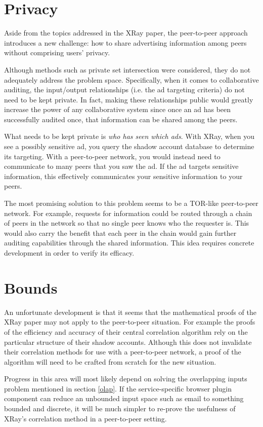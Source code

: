 \documentclass[12pt]{article}
\begin{document}
\section{Privacy}

Aside from the topics addressed in the XRay paper, the peer-to-peer approach
introduces a new challenge: how to share advertising information among peers
without comprising users' privacy.

Although methods such as private set intersection were considered, they do not
adequately address the problem space. Specifically, when it comes to
collaborative auditing, the input/output relationships (i.e. the ad targeting
criteria) do not need to be kept private. In fact, making these relationships
public would greatly increase the power of any collaborative system since once
an ad has been successfully audited once, that information can be shared among
the peers.

What needs to be kept private is {\it who has seen which ads}. With XRay, when
you see a possibly sensitive ad, you query the shadow account database to
determine its targeting. With a peer-to-peer network, you would instead need to
communicate to many peers that you saw the ad. If the ad targets sensitive
information, this effectively communicates your sensitive information to your
peers.

The most promising solution to this problem seems to be a TOR-like peer-to-peer
network. For example, requests for information could be routed through a chain
of peers in the network so that no single peer knows who the requester is. This
would also carry the benefit that each peer in the chain would gain further
auditing capabilities through the shared information. This idea requires
concrete development in order to verify its efficacy.

\section{Bounds}

An unfortunate development is that it seems that the mathematical proofs of the
XRay paper may not apply to the peer-to-peer situation. For example the proofs
of the efficiency and accuracy of their central correlation algorithm rely on
the particular structure of their shadow accounts. Although this does not
invalidate their correlation methods for use with a peer-to-peer network, a
proof of the algorithm will need to be crafted from scratch for the new
situation.

Progress in this area will most likely depend on solving the overlapping inputs
problem mentioned in section \ref{olap}. If the service-specific browser plugin
component can reduce an unbounded input space such as email to something bounded
and discrete, it will be much simpler to re-prove the usefulness of XRay's
correlation method in a peer-to-peer setting.
\end{document}
